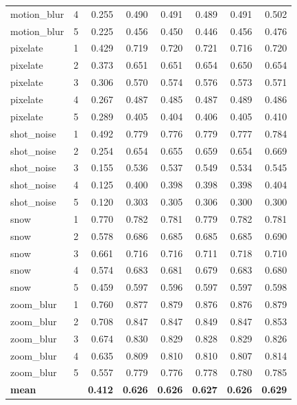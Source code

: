 {\begin{longtable}{lrrrrrrr}
motion\_blur & 4 & 0.255 & 0.490 & 0.491 & 0.489 & 0.491 & 0.502 \\
motion\_blur & 5 & 0.225 & 0.456 & 0.450 & 0.446 & 0.456 & 0.476 \\
pixelate & 1 & 0.429 & 0.719 & 0.720 & 0.721 & 0.716 & 0.720 \\
pixelate & 2 & 0.373 & 0.651 & 0.651 & 0.654 & 0.650 & 0.654 \\
pixelate & 3 & 0.306 & 0.570 & 0.574 & 0.576 & 0.573 & 0.571 \\
pixelate & 4 & 0.267 & 0.487 & 0.485 & 0.487 & 0.489 & 0.486 \\
pixelate & 5 & 0.289 & 0.405 & 0.404 & 0.406 & 0.405 & 0.410 \\
shot\_noise & 1 & 0.492 & 0.779 & 0.776 & 0.779 & 0.777 & 0.784 \\
shot\_noise & 2 & 0.254 & 0.654 & 0.655 & 0.659 & 0.654 & 0.669 \\
shot\_noise & 3 & 0.155 & 0.536 & 0.537 & 0.549 & 0.534 & 0.545 \\
shot\_noise & 4 & 0.125 & 0.400 & 0.398 & 0.398 & 0.398 & 0.404 \\
shot\_noise & 5 & 0.120 & 0.303 & 0.305 & 0.306 & 0.300 & 0.300 \\
snow & 1 & 0.770 & 0.782 & 0.781 & 0.779 & 0.782 & 0.781 \\
snow & 2 & 0.578 & 0.686 & 0.685 & 0.685 & 0.685 & 0.690 \\
snow & 3 & 0.661 & 0.716 & 0.716 & 0.711 & 0.718 & 0.710 \\
snow & 4 & 0.574 & 0.683 & 0.681 & 0.679 & 0.683 & 0.680 \\
snow & 5 & 0.459 & 0.597 & 0.596 & 0.597 & 0.597 & 0.598 \\
zoom\_blur & 1 & 0.760 & 0.877 & 0.879 & 0.876 & 0.876 & 0.879 \\
zoom\_blur & 2 & 0.708 & 0.847 & 0.847 & 0.849 & 0.847 & 0.853 \\
zoom\_blur & 3 & 0.674 & 0.830 & 0.829 & 0.828 & 0.829 & 0.826 \\
zoom\_blur & 4 & 0.635 & 0.809 & 0.810 & 0.810 & 0.807 & 0.814 \\
zoom\_blur & 5 & 0.557 & 0.779 & 0.776 & 0.778 & 0.780 & 0.785 \\
\midrule
\textbf{mean} & & \textbf{0.412} & \textbf{0.626} & \textbf{0.626} & \textbf{0.627} & \textbf{0.626} & \textbf{0.629} \\
\bottomrule
\end{longtable}}

